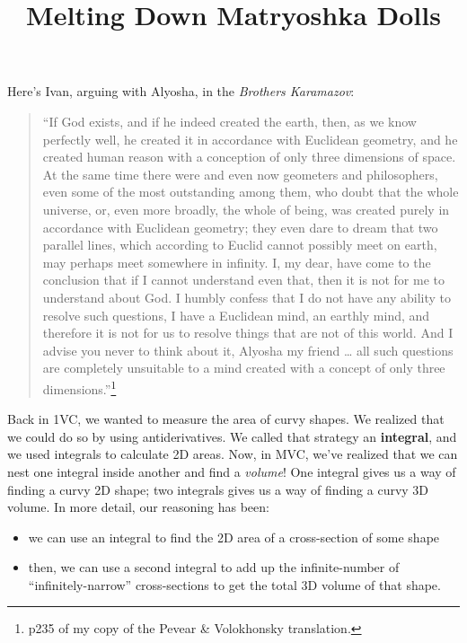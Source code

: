 \documentclass[
]{article}
\title{Melting Down Matryoshka Dolls}
\author{}
\date{}
\providecommand{\tightlist}{%
  \setlength{\itemsep}{0pt}\setlength{\parskip}{0pt}}
\begin{document}
\maketitle

Here's Ivan, arguing with Alyosha, in the \emph{Brothers Karamazov}:

\begin{quote}
``If God exists, and if he indeed created the earth, then, as we know perfectly well, he created it in accordance with Euclidean geometry, and he created human reason with a conception of only three dimensions of space. At the same time there were and even now geometers and philosophers, even some of the most outstanding among them, who doubt that the whole universe, or, even more broadly, the whole of being, was created purely in accordance with Euclidean geometry; they even dare to dream that two parallel lines, which according to Euclid cannot possibly meet on earth, may perhaps meet somewhere in infinity. I, my dear, have come to the conclusion that if I cannot understand even that, then it is not for me to understand about God. I humbly confess that I do not have any ability to resolve such questions, I have a Euclidean mind, an earthly mind, and therefore it is not for us to resolve things that are not of this world. And I advise you never to think about it, Alyosha my friend \ldots{} all such questions are completely unsuitable to a mind created with a concept of only three dimensions.''\footnote{p235 of my copy of the Pevear \& Volokhonsky translation.}
\end{quote}

Back in 1VC, we wanted to measure the area of curvy shapes. We realized that we could do so by using antiderivatives. We called that strategy an \textbf{integral}, and we used integrals to calculate 2D areas. Now, in MVC, we've realized that we can nest one integral inside another and find a \emph{volume}! One integral gives us a way of finding a curvy 2D shape; two integrals gives us a way of finding a curvy 3D volume. In more detail, our reasoning has been:

\begin{itemize}
\tightlist
\item
  we can use an integral to find the 2D area of a cross-section of some shape
\item
  then, we can use a second integral to add up the infinite-number of ``infinitely-narrow'' cross-sections to get the total 3D volume of that shape.
\end{itemize}
\end{document}
